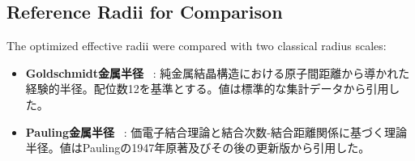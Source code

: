 \documentclass[a4paper,10pt,5p]{elsarticle}
\begin{document}




\subsection{Reference Radii for Comparison}

The optimized effective radii were compared with two classical radius scales:
\begin{itemize}
\setlength{\parskip}{0cm} %
\setlength{\itemsep}{0cm} %
    \item \textbf{Goldschmidt金属半径} ~\citep{goldschmidt1927}: 純金属結晶構造における原子間距離から導かれた経験的半径。配位数12を基準とする。値は標準的な集計データから引用した。
   \item \textbf{Pauling金属半径} ~\citep{pauling1947}: 価電子結合理論と結合次数-結合距離関係に基づく理論半径。値はPaulingの1947年原著及びその後の更新版から引用した。
\end{itemize}


\end{document}
